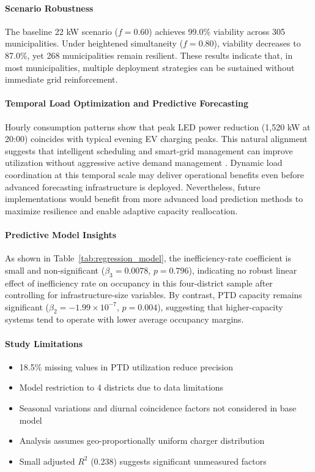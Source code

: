\documentclass[conference]{IEEEtran}
\begin{document}
\paragraph{Scenario Robustness}
The baseline 22 kW scenario ($f=0.60$) achieves 99.0\% viability across 305 municipalities. Under heightened simultaneity ($f=0.80$), viability decreases to 87.0\%, yet 268 municipalities remain resilient. These results indicate that, in most municipalities, multiple deployment strategies can be sustained without immediate grid reinforcement.

\paragraph{Temporal Load Optimization and Predictive Forecasting}
Hourly consumption patterns show that peak LED power reduction (1,520 kW at 20:00) coincides with typical evening EV charging peaks. This natural alignment suggests that intelligent scheduling and smart-grid management can improve utilization without aggressive active demand management \cite{Gouveia2015}. Dynamic load coordination at this temporal scale may deliver operational benefits even before advanced forecasting infrastructure is deployed. Nevertheless, future implementations would benefit from more advanced load prediction methods to maximize resilience and enable adaptive capacity reallocation.

\paragraph{Predictive Model Insights}
As shown in Table~\ref{tab:regression_model}, the inefficiency-rate coefficient is small and non-significant ($\beta_3 = 0.0078$, $p = 0.796$), indicating no robust linear effect of inefficiency rate on occupancy in this four-district sample after controlling for infrastructure-size variables. By contrast, PTD capacity remains significant ($\beta_2 = -1.99 \times 10^{-7}$, $p = 0.004$), suggesting that higher-capacity systems tend to operate with lower average occupancy margins.

\paragraph{Study Limitations}
\begin{itemize}
\item 18.5\% missing values in PTD utilization reduce precision
\item Model restriction to 4 districts due to data limitations
\item Seasonal variations and diurnal coincidence factors not considered in base model
\item Analysis assumes geo-proportionally uniform charger distribution
\item Small adjusted $R^2$ (0.238) suggests significant unmeasured factors
\end{itemize}
\end{document}

